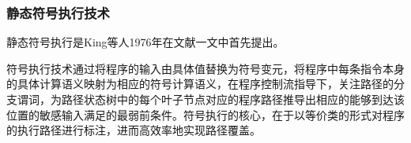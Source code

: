 %

\subsubsection{静态符号执行技术}

静态符号执行是King等人1976年在文献一文中首先提出。

符号执行技术通过将程序的输入由具体值替换为符号变元，将程序中每条指令本身的具体计算语义映射为相应的符号计算语义，在程序控制流指导下，关注路径的分支谓词，为路径状态树中的每个叶子节点对应的程序路径推导出相应的能够到达该位置的敏感输入满足的最弱前条件。符号执行的核心，在于以等价类的形式对程序的执行路径进行标注，进而高效率地实现路径覆盖。

%


